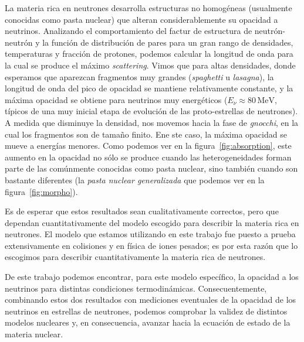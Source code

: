 La materia rica en neutrones desarrolla estructuras no homogéneas (usualmente conocidas como pasta nuclear) que alteran considerablemente su opacidad a neutrinos.
Analizando el comportamiento del factur de estructura de neutrón-neutrón y la función de distribución de pares para un gran rango de densidades, temperaturas y fracción de protones, podemos calcular la longitud de onda para la cual se produce el máximo \emph{scattering}.
Vimos que para altas densidades, donde esperamos que aparezcan fragmentos muy grandes (\emph{spaghetti} u \emph{lasagna}), la longitud de onda del pico de opacidad se mantiene relativamente constante, y la máxima opacidad se obtiene para neutrinos muy energéticos ($E_\nu \approx 80\,\text{MeV}$, típicos de una muy inicial etapa de evolución de las proto-estrellas de neutrones).
A medida que disminuye la densidad, nos movemos hacia la fase de \emph{gnocchi}, en la cual los fragmentos son de tamaño finito.
Ene ste caso, la máxima opacidad se mueve a energías menores.
Como podemos ver en la figura~\ref{fig:absorption}, este aumento en la opacidad no sólo se produce cuando las heterogeneidades forman parte de las comúnmente conocidas como pasta nuclear, sino también cuando son bastante diferentes (la \emph{pasta nuclear generalizada} que podemos ver en la figura~\ref{fig:morpho}).

Es de esperar que estos resultados sean cualitativamente correctos, pero que dependan cuantitativamente del modelo escogido para describir la materia rica en neutrones.
El modelo que estamos utilizando en este trabajo fue puesto a prueba extensivamente en colisiones y en física de iones pesados; es por esta razón que lo escogimos para describir cuantitativamente la materia rica de neutrones.

De este trabajo podemos encontrar, para este modelo específico, la opacidad a los neutrinos para distintas condiciones termodinámicas.
Consecuentemente, combinando estos dos resultados con mediciones eventuales de la opacidad de los neutrinos en estrellas de neutrones, podemos comprobar la validez de distintos modelos nucleares y, en consecuencia, avanzar hacia la ecuación de estado de la materia nuclear.

